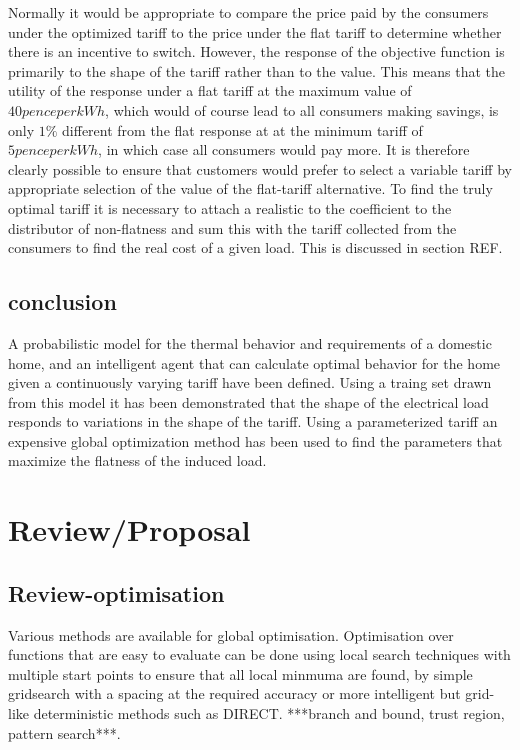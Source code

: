 \documentclass[a4paper, 10 pt, conference]{ieeeconf}  %
\begin{document}
Normally it would be appropriate to compare the price paid by the consumers under the optimized tariff to the price under the flat tariff to determine whether there is an incentive to switch. However, the response of the objective function is primarily to the shape of the tariff rather than to the value. This means that the utility of the response under a flat tariff at the maximum value of $40 pence per kWh$, which would of course lead to all consumers making savings, is only $1\%$ different from the flat response at at the minimum tariff of $5 pence per kWh$, in which case all consumers would pay more. It is therefore clearly possible to ensure that customers would prefer to select a variable tariff by appropriate selection of the value of the flat-tariff alternative. To find the truly optimal tariff it is necessary to attach a realistic to the coefficient to the distributor of non-flatness and sum this with the tariff collected from the consumers to find the real cost of a given load. This is discussed in section REF.

\subsection{conclusion}
A probabilistic model for the thermal behavior and requirements of a domestic home, and an intelligent agent that can calculate optimal behavior for the home given a continuously varying tariff have been defined. Using a traing set drawn from this model it has been demonstrated that the shape of the electrical load responds to variations in the shape of the tariff. Using a parameterized tariff an expensive global optimization method has been used to find the parameters that maximize the flatness of the induced load. 





\onecolumn
\large
\section{Review/Proposal}
\doublespacing
\subsection{Review-optimisation}
Various methods are available for global optimisation. Optimisation over functions that are easy to evaluate can be done using local search techniques with multiple start points to ensure that all local minmuma are found, by simple gridsearch with a spacing at the required accuracy or more intelligent but grid-like deterministic methods such as DIRECT. ***branch and bound, trust region, pattern search***.
\end{document}
